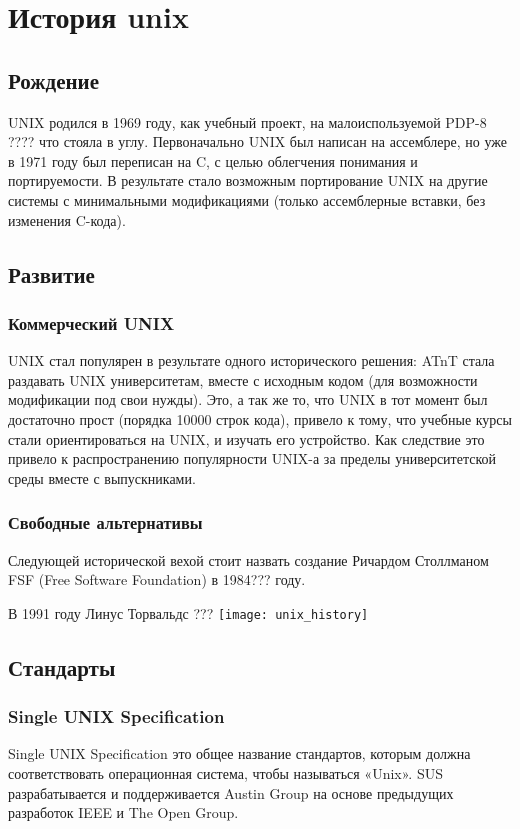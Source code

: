 \chapter {История unix}
\section {Рождение}
UNIX родился в 1969 году, как учебный проект, на малоиспользуемой PDP-8 ???? что стояла в углу.
Первоначально UNIX был написан на ассемблере, но уже в 1971 году был переписан на C, с целью облегчения понимания и портируемости. В результате стало возможным портирование UNIX на другие системы с минимальными модификациями (только ассемблерные вставки, без изменения C-кода).
\section {Развитие}
\subsection {Коммерческий UNIX}
UNIX стал популярен в результате одного исторического решения: ATnT стала раздавать UNIX университетам, вместе с исходным кодом (для возможности модификации под свои нужды). Это, а так же то, что UNIX в тот момент был достаточно прост (порядка 10000 строк кода), привело к тому, что учебные курсы стали ориентироваться на UNIX, и изучать его устройство. Как следствие это привело к распространению популярности UNIX-а за пределы университетской среды вместе с выпускниками.
\subsection {Свободные альтернативы}
Следующей исторической вехой стоит назвать создание Ричардом Столлманом FSF (Free Software Foundation) в 1984??? году. 

В 1991 году Линус Торвальдс ???
\texttt{[image: unix\_history]}
\section {Стандарты}
\subsection {Single UNIX Specification}
Single UNIX Specification это общее название стандартов, которым должна соответствовать операционная система, чтобы называться «Unix». SUS разрабатывается и поддерживается Austin Group на основе предыдущих разработок IEEE и The Open Group.
